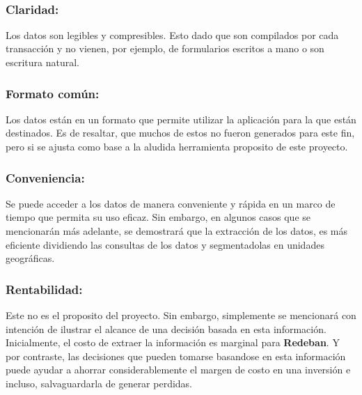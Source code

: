 \documentclass[a4paper]{article}
\begin{document}
\\

\subsubsection*{Claridad:}

Los datos son legibles y compresibles. Esto dado que son compilados por cada transacción y no vienen, por ejemplo, de formularios escritos a mano o son escritura natural.

\subsubsection*{Formato común:}

Los datos están en un formato que permite utilizar la aplicación para la que están destinados. Es de resaltar, que muchos de estos no fueron generados para este fin, pero si se ajusta como base a la aludida herramienta proposito de este proyecto.

\subsubsection*{Conveniencia:}

Se puede acceder a los datos de manera conveniente y rápida en un marco de tiempo que permita su uso eficaz. Sin embargo, en algunos casos que se mencionarán más adelante, se demostrará que la extracción de los datos, es más eficiente dividiendo las consultas de los datos y segmentadolas en unidades geográficas.

\subsubsection*{Rentabilidad:}

Este no es el proposito del proyecto. Sin embargo, simplemente se mencionará con intención de ilustrar el alcance de una decisión basada en esta información. Inicialmente, el costo de extraer la información es marginal para \textbf{Redeban}. Y por contraste, las decisiones que pueden tomarse basandose en esta información puede ayudar a ahorrar considerablemente el margen de costo en una inversión e incluso, salvaguardarla de generar perdidas.
\end{document}
